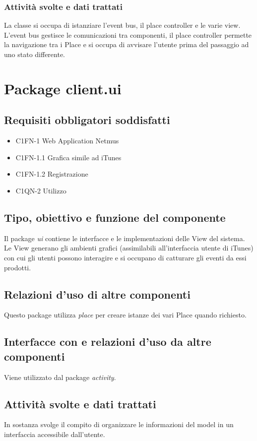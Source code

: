 \subsubsection*{Attivit\`a svolte e dati trattati}
La classe si occupa di istanziare l'event bus, il place controller e le varie
view. L'event bus gestisce le comunicazioni tra componenti, il place
controller permette la navigazione tra i Place e si occupa di avvisare
l'utente prima del passaggio ad uno stato differente.


\newpage
\section{Package client.ui} %
\subsection*{Requisiti obbligatori soddisfatti}
\begin{itemize}
	\item C1FN-1 Web Application Netmus
	\item C1FN-1.1 Grafica simile ad iTunes
	\item C1FN-1.2 Registrazione
	\item C1QN-2 Utilizzo
\end{itemize}
\subsection*{Tipo, obiettivo e funzione del componente}
Il package \emph{ui} contiene le interfacce e le implementazioni delle View del
sistema. Le View generano gli ambienti grafici (assimilabili all'interfaccia
utente di iTunes) con cui gli utenti possono interagire e si occupano di
catturare gli eventi da essi prodotti.


\subsection*{Relazioni d'uso di altre componenti}
Questo package utilizza \emph{place} per creare istanze dei vari Place quando
richiesto.

\subsection*{Interfacce con e relazioni d'uso da altre componenti}
Viene utilizzato dal package \emph{activity}.

\subsection*{Attivit\`a svolte e dati trattati}
In sostanza svolge il compito di organizzare le informazioni del model in un
interfaccia accessibile dall'utente.

